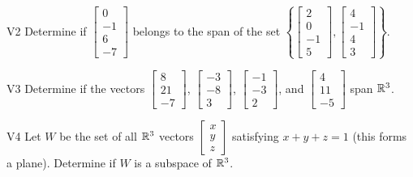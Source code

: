 \documentclass{sbgLAsemi}
\begin{document}
\begin{problem}{V2}
  Determine if
  \(\begin{bmatrix} 0 \\ -1 \\ 6 \\ -7 \end{bmatrix}\)
  belongs to the span of the set
  \(\left\{
    \begin{bmatrix} 2 \\ 0 \\ -1 \\ 5 \end{bmatrix},
    \begin{bmatrix} 4 \\ -1 \\ 4 \\ 3 \end{bmatrix}
    \right\}
  \).
\end{problem}

\begin{problem}{V3}
Determine if the vectors  $\begin{bmatrix} 8 \\ 21 \\ -7 \end{bmatrix}$, $\begin{bmatrix} -3 \\ -8 \\ 3 \end{bmatrix}$, $\begin{bmatrix} -1 \\ -3 \\ 2 \end{bmatrix}$, and $\begin{bmatrix} 4 \\ 11 \\ -5 \end{bmatrix}$ span $\mathbb{R}^3$.
\end{problem}

\begin{problem}{V4} Let \(W\) be the set of all \(\mathbb{R}^3\) vectors
\(\begin{bmatrix} x \\ y \\ z \end{bmatrix}\)
satisfying \(x+y+z=1\) (this forms a plane).
Determine if \(W\) is a subspace of \(\mathbb{R}^3\).
\end{problem}
\end{document}
